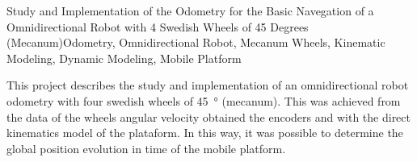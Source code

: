 
\begin{theabstract}{Study and Implementation of the Odometry for the Basic Navegation of a Omnidirectional Robot with 4 Swedish Wheels of 45 Degrees (Mecanum)}{Odometry, Omnidirectional Robot, Mecanum Wheels, Kinematic Modeling, Dynamic Modeling, Mobile Platform}

This project describes the study and implementation of an omnidirectional robot odometry with four swedish wheels of \si{45\degree} (mecanum). This was achieved from the data of the wheels angular velocity obtained the encoders and with the direct kinematics model of the plataform. In this way, it was possible to determine the global position evolution in time of the mobile platform.
 


 
\end{theabstract}

